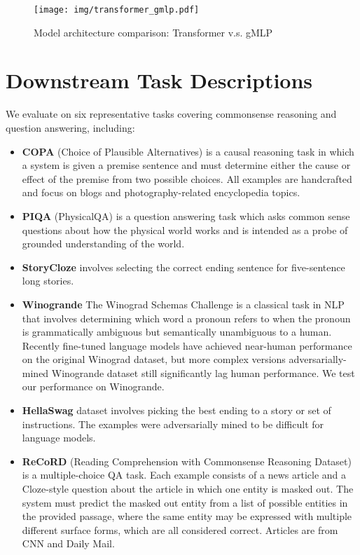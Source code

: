 \documentclass{article}
\begin{document}
\begin{figure}[ht!]
    \centering
    \texttt{[image: img/transformer\_gmlp.pdf]}
    \vspace{-3mm}
    \caption{Model architecture comparison: Transformer v.s. gMLP}
    \label{fig:transformer_gmlp}
\end{figure}

\section{Downstream Task Descriptions}
\label{sec:app_downstream_task_description}

We evaluate on six representative tasks covering commonsense reasoning and question answering, including:
\begin{itemize}
    \item \textbf{COPA} (Choice of Plausible Alternatives) \citep{roemmele2011choice} is a causal reasoning task in which a system is given a premise sentence and must determine either the cause or effect of the premise from two possible choices. All examples are handcrafted and focus on blogs and photography-related encyclopedia topics.
    \item \textbf{PIQA} (PhysicalQA) \citep{bisk2020piqa} is a question answering task which asks common sense questions about how the physical world works and is intended as a probe of grounded understanding of the world. 
    \item \textbf{StoryCloze} \citep{mostafazadeh2016corpus} involves selecting the correct ending sentence for five-sentence long stories.
    \item \textbf{Winogrande} The Winograd Schemas Challenge \citep{levesque2012winograd} is a classical task in NLP that involves determining which word a pronoun refers to when the pronoun is grammatically ambiguous but semantically unambiguous to a human. Recently fine-tuned language models have achieved near-human performance on the original Winograd dataset, but more complex versions adversarially-mined Winogrande dataset \citep{sakaguchi2020winogrande} still significantly lag human performance. We test our performance on Winogrande.
    \item \textbf{HellaSwag} dataset \citep{zellers2019hellaswag} involves picking the best ending to a story or set of instructions. The examples were adversarially mined to be difficult for language models.
    \item \textbf{ReCoRD} (Reading Comprehension with Commonsense Reasoning Dataset) \citep{zhang2018record} is a multiple-choice QA task. Each example consists of a news article and a Cloze-style question about the article in which one entity is masked out. The system must predict the masked out entity from a list of possible entities in the provided passage, where the same entity may be expressed with multiple different surface forms, which are all considered correct. Articles are from CNN and Daily Mail. 
\end{itemize}








 
\end{document}
